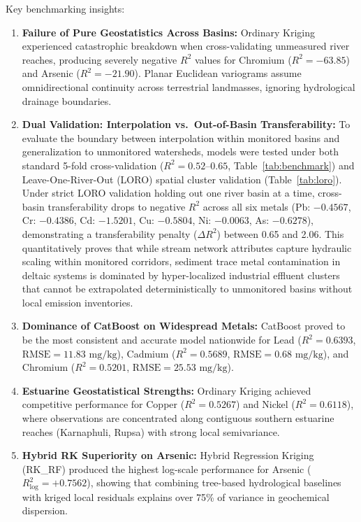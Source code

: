 \documentclass[authoryear,preprint,12pt]{elsarticle}
\begin{document}
Key benchmarking insights:
\begin{enumerate}
    \item \textbf{Failure of Pure Geostatistics Across Basins:} Ordinary Kriging experienced catastrophic breakdown when cross-validating unmeasured river reaches, producing severely negative $R^2$ values for Chromium ($R^2 = -63.85$) and Arsenic ($R^2 = -21.90$). Planar Euclidean variograms assume omnidirectional continuity across terrestrial landmasses, ignoring hydrological drainage boundaries.
    \item \textbf{Dual Validation: Interpolation vs.\ Out-of-Basin Transferability:} To evaluate the boundary between interpolation within monitored basins and generalization to unmonitored watersheds, models were tested under both standard 5-fold cross-validation ($R^2 = 0.52\text{--}0.65$, Table~\ref{tab:benchmark}) and Leave-One-River-Out (LORO) spatial cluster validation (Table~\ref{tab:loro}). Under strict LORO validation holding out one river basin at a time, cross-basin transferability drops to negative $R^2$ across all six metals (Pb: $-0.4567$, Cr: $-0.4386$, Cd: $-1.5201$, Cu: $-0.5804$, Ni: $-0.0063$, As: $-0.6278$), demonstrating a transferability penalty ($\Delta R^2$) between 0.65 and 2.06. This quantitatively proves that while stream network attributes capture hydraulic scaling within monitored corridors, sediment trace metal contamination in deltaic systems is dominated by hyper-localized industrial effluent clusters that cannot be extrapolated deterministically to unmonitored basins without local emission inventories.
    \item \textbf{Dominance of CatBoost on Widespread Metals:} CatBoost proved to be the most consistent and accurate model nationwide for Lead ($R^2 = 0.6393$, $\text{RMSE} = 11.83\text{ mg/kg}$), Cadmium ($R^2 = 0.5689$, $\text{RMSE} = 0.68\text{ mg/kg}$), and Chromium ($R^2 = 0.5201$, $\text{RMSE} = 25.53\text{ mg/kg}$).
    \item \textbf{Estuarine Geostatistical Strengths:} Ordinary Kriging achieved competitive performance for Copper ($R^2 = 0.5267$) and Nickel ($R^2 = 0.6118$), where observations are concentrated along contiguous southern estuarine reaches (Karnaphuli, Rupsa) with strong local semivariance.
    \item \textbf{Hybrid RK Superiority on Arsenic:} Hybrid Regression Kriging (RK\_RF) produced the highest log-scale performance for Arsenic ($R^2_{\log} = +0.7562$), showing that combining tree-based hydrological baselines with kriged local residuals explains over 75\% of variance in geochemical dispersion.
\end{enumerate}
\end{document}
